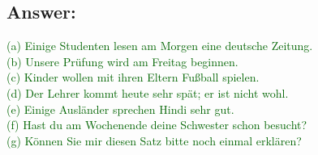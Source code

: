 \documentclass[a4paper,12pt]{article}
\begin{document}
\subsection*{Answer:}
\textcolor{darkgreen}{(a) Einige Studenten lesen am Morgen eine deutsche Zeitung.}\\
\textcolor{darkgreen}{(b) Unsere Prüfung wird am Freitag beginnen.}\\
\textcolor{darkgreen}{(c) Kinder wollen mit ihren Eltern Fußball spielen.}\\
\textcolor{darkgreen}{(d) Der Lehrer kommt heute sehr spät; er ist nicht wohl.}\\
\textcolor{darkgreen}{(e) Einige Ausländer sprechen Hindi sehr gut.}\\
\textcolor{darkgreen}{(f) Hast du am Wochenende deine Schwester schon besucht?}\\
\textcolor{darkgreen}{(g) Können Sie mir diesen Satz bitte noch einmal erklären?}\\
\end{document}
